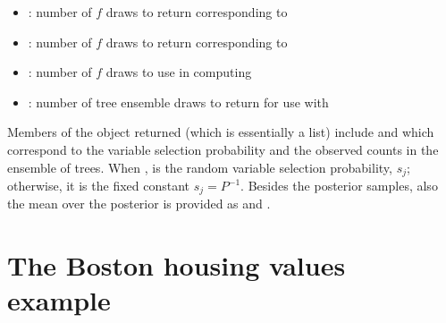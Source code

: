 \documentclass[article]{jss}
\begin{document}
\begin{itemize}
\item {} : number of $f$ draws to return corresponding to 
\item {} :  number of $f$ draws to return corresponding to 
\item {} : number of $f$ draws to use in computing 
\item {} : number of tree ensemble draws to return for use
with 
\end{itemize}

Members of the object returned (which is essentially a list) include
 and  which correspond to the variable
selection probability and the observed counts in the ensemble of
trees.  When ,  is the random variable
selection probability, $s_j$; otherwise, it is the fixed constant
$s_j=P^{-1}$.  Besides the posterior samples, also the mean over the
posterior is provided as  and .

\section{The Boston housing values example}\label{boston} 
\end{document}

